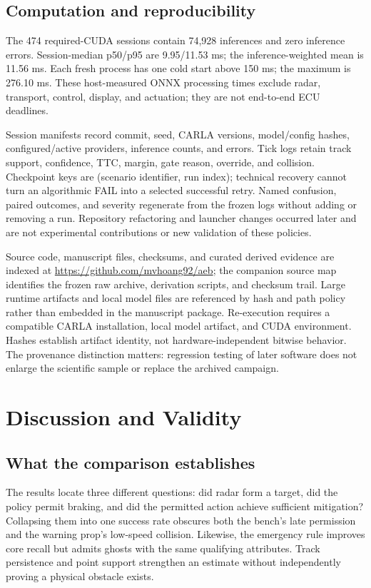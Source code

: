 \documentclass[conference]{IEEEtran}
\begin{document}
\subsection{Computation and reproducibility}
The 474 required-CUDA sessions contain 74,928 inferences and zero inference
errors. Session-median p50/p95 are 9.95/11.53 ms; the inference-weighted mean is
11.56 ms. Each fresh process has one cold start above 150 ms; the maximum is
276.10 ms. These host-measured ONNX processing times exclude radar, transport,
control, display, and actuation; they are not end-to-end ECU deadlines.

Session manifests record commit, seed, CARLA versions, model/config hashes,
configured/active providers, inference counts, and errors. Tick logs retain
track support, confidence, TTC, margin, gate reason, override, and collision.
Checkpoint keys are (scenario identifier, run index); technical recovery cannot
turn an algorithmic FAIL into a selected successful retry. Named confusion,
paired outcomes, and severity regenerate from the frozen logs without adding
or removing a run. Repository refactoring and launcher changes occurred later
and are not experimental contributions or new validation of these policies.

Source code, manuscript files, checksums, and curated derived evidence are indexed at
\url{https://github.com/mvhoang92/aeb}; the companion source map identifies the
frozen raw archive, derivation scripts, and checksum trail. Large runtime artifacts
and local model files are referenced by hash and path policy rather than embedded
in the manuscript package. Re-execution requires a compatible CARLA installation,
local model artifact, and CUDA environment.
Hashes establish artifact identity, not hardware-independent bitwise behavior.
The provenance distinction matters: regression testing of later software does
not enlarge the scientific sample or replace the archived campaign.

\section{Discussion and Validity}
\subsection{What the comparison establishes}
The results locate three different questions: did radar form a target, did the
policy permit braking, and did the permitted action achieve sufficient
mitigation? Collapsing them into one success rate obscures both the bench's late
permission and the warning prop's low-speed collision. Likewise, the emergency
rule improves core recall but admits ghosts with the same qualifying attributes.
Track persistence and point support strengthen an estimate without independently
proving a physical obstacle exists.
\end{document}
